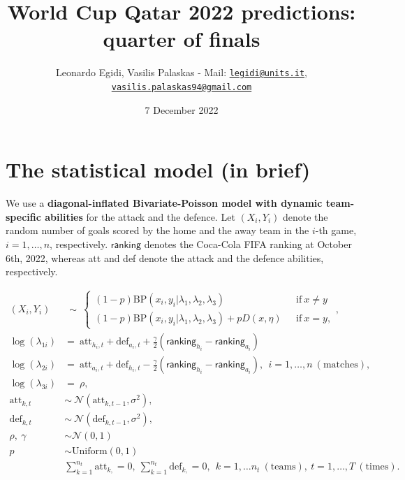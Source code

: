 \documentclass[
  10pt,
]{article}
\title{World Cup Qatar 2022 predictions: quarter of finals}
\author{Leonardo Egidi, Vasilis Palaskas - Mail:
\href{mailto:legidi@units.it}{\nolinkurl{legidi@units.it}},
\href{mailto:vasilis.palaskas94@gmail.com}{\nolinkurl{vasilis.palaskas94@gmail.com}}}
\date{7 December 2022}
\begin{document}
\maketitle

{
\setcounter{tocdepth}{2}
\tableofcontents
}
\hypertarget{the-statistical-model-in-brief}{%
\section{The statistical model (in
brief)}\label{the-statistical-model-in-brief}}

We use a \textbf{diagonal-inflated Bivariate-Poisson model with dynamic
team-specific abilities} for the attack and the defence. Let
\((X_{i}, Y_{i})\) denote the random number of goals scored by the home
and the away team in the \(i\)-th game, \(i=1,\ldots,n\), respectively.
\(\mathsf{ranking}\) denotes the Coca-Cola FIFA ranking at October 6th,
2022, whereas att and def denote the attack and the defence abilities,
respectively.

\begin{align}
(X_i, Y_i) &\ \sim \ \begin{cases} (1-p) \text{BP}(x_i, y_i |\lambda_1, \lambda_2, \lambda_3) \ \ \ & \text{if} \    x \ne y \\ (1-p) \text{BP}(x_i, y_i | \lambda_1, \lambda_2, \lambda_3) + pD(x, \eta) \ \ \ & \text{if} \   x = y, \end{cases}, \\
\log(\lambda_{1i}) &=\    \text{att}_{h_i, t}+ \text{def}_{a_i,t} + \frac{\gamma}{2}(\mathsf{ranking}_{h_i}-\mathsf{ranking}_{a_i}) \\
\log(\lambda_{2i}) & =\    \text{att}_{a_i,t} + \text{def}_{h_i,t} - \frac{\gamma}{2}(\mathsf{ranking}_{h_i}-\mathsf{ranking}_{a_i}), \ \ i=1,\ldots,n\ (\text{matches}), \\
\log(\lambda_{3i}) & =\ \rho,\\
\text{att}_{k, t}&  \sim \ \mathcal{N}(\text{att}_{k, t-1}, \sigma^2), \\
\text{def}_{k, t} & \sim \  \mathcal{N}(\text{def}_{k, t-1}, \sigma^2),\\
\rho, \ \gamma & \sim \mathcal{N}(0,1) \\
p & \sim \text{Uniform}(0,1)\\
& \sum_{k=1}^{n_t} \text{att}_{k, }=0, \  \sum_{k=1}^{n_t}\text{def}_{k, }=0, \ \ k=1,\ldots n_t \ (\text{teams}), \  t=1,\ldots, T \ (\text{times}).
\label{eq:scoring_rue}
\end{align}
\end{document}
